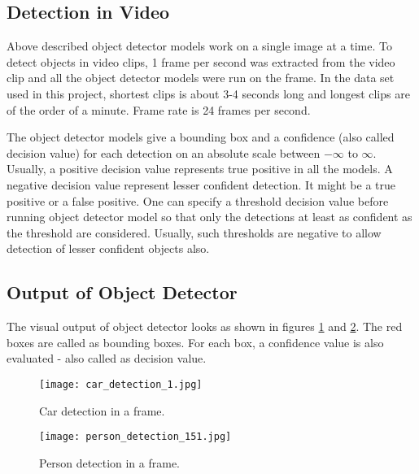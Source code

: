 \subsection{Detection in Video}
Above described object detector models work on a single image at a time. To detect objects in video clips, 1 frame per second was extracted from the video clip and all the object detector models were run on the frame. In the data set used in this project, shortest clips is about 3-4 seconds long and longest clips are of the order of a minute. Frame rate is 24 frames per second.

The object detector models give a bounding box and a confidence (also called decision value) for each detection 
on an absolute scale between $-\infty$ to $\infty$. 
Usually, a positive decision value represents true positive in all the models. 
A negative decision value represent lesser confident detection. 
It might be a true positive or a false positive. 
One can specify a threshold decision value before running object detector model 
so that only the detections at least as confident as the threshold are considered.
Usually, such thresholds are negative to allow detection of lesser confident objects also.

\subsection{Output of Object Detector}

The visual output of object detector looks as shown in figures \ref{fig:CarDetection} and \ref{fig:PersonDetection}. 
The red boxes are called as bounding boxes.
For each box, a confidence value is also evaluated - also called as decision value.

\begin{figure}[here]
\begin{center} 
\texttt{[image: car\_detection\_1.jpg]} 
\caption{ Car detection in a frame. \label{fig:CarDetection}} 
\end{center} 
\end{figure}  

\begin{figure}[here]
\begin{center} 
\texttt{[image: person\_detection\_151.jpg]} 
\caption{ Person detection in a frame. \label{fig:PersonDetection}} 
\end{center} 
\end{figure}  

